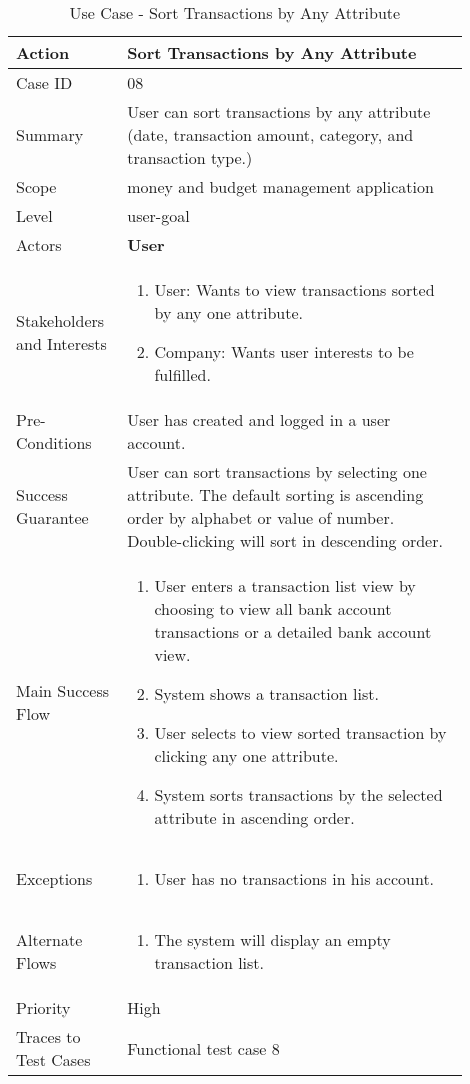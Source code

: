 \documentclass[11pt]{article}
\newcounter{use case ID}
\newcommand\tabularhead[1]{
    \begin{table}[ht]
        \addtocounter{use case ID}{1}
        \caption{Use Case \arabic{use case ID} - #1}
        \vspace{0.2cm}
        \begin{tabular}{|p{0.2\linewidth}|p{0.70\linewidth}|}
            \hline
            \textbf{Action} & \textbf{#1} \\
            \hline}
\newcommand\addrow[2]{#1 & #2\\ \hline}
\newcommand\addmulrow[2]{ \begin{minipage}[t][][t]{2.5cm}#1\end{minipage}
                &\begin{minipage}[t][][t]{11cm}
                    \begin{enumerate}[itemsep=-1ex] #2   \end{enumerate}
                \end{minipage}\vfill\\ \hline}
\newenvironment{usecase}{\tabularhead}
        {\hline\end{tabular}\end{table}}
\begin{document}
\begin{usecase}{Sort Transactions by Any Attribute}
    \addrow{Case ID}{08}
    \addrow{Summary}{User can sort transactions by any attribute (date, transaction amount, category, and transaction type.)}
    \addrow{Scope}{money and budget management application}
    \addrow{Level}{user-goal}
    \addrow{Actors}{\textbf{User}}
    \addmulrow{Stakeholders and Interests}{
    \item User: Wants to view transactions sorted by any one attribute.
    \item Company: Wants user interests to be fulfilled.}
    \addrow{Pre-Conditions}{User has created and logged in a user account.}
    \addrow{Success Guarantee}{User can sort transactions by selecting one attribute. The default sorting is ascending order by alphabet or value of number. Double-clicking will sort in descending order.}
    \addmulrow{Main Success Flow}{
    \item User enters a transaction list view by choosing to view all bank account transactions or a detailed bank account view.
    \item System shows a transaction list.
    \item User selects to view sorted transaction by clicking any one attribute.
    \item System sorts transactions by the selected attribute in ascending order.}
    \addmulrow{Exceptions}{
    \item User has no transactions in his account.}
    \addmulrow{Alternate Flows}{
      \item The system will display an empty transaction list.}
    \addrow{Priority}{High}
    \addrow{Traces to Test Cases}{Functional test case 8}
\end{usecase}
\end{document}

